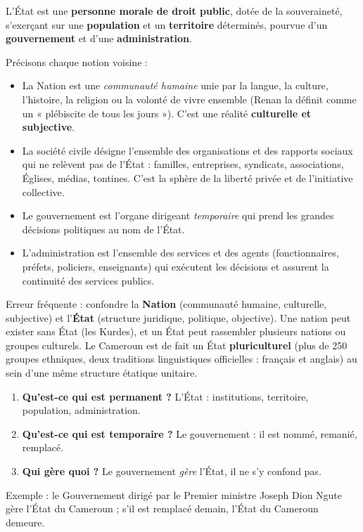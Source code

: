 \documentclass[11pt]{article}
\newcommand{\cle}[1]{{\popxbold\color{popdark}#1}}
\begin{document}
\begin{definition}[L'État]
L'\cle{État} est une \textbf{personne morale de droit public}, dotée de la \cle{souveraineté}, s'exerçant sur une \textbf{population} et un \textbf{territoire} déterminés, pourvue d'un \textbf{gouvernement} et d'une \textbf{administration}.
\end{definition}

Précisons chaque notion voisine :

\begin{itemize}
\item La \cle{Nation} est une \emph{communauté humaine} unie par la langue, la culture, l'histoire, la religion ou la volonté de vivre ensemble (Renan la définit comme un « plébiscite de tous les jours »). C'est une réalité \textbf{culturelle et subjective}.
\item La \cle{société civile} désigne l'ensemble des organisations et des rapports sociaux qui ne relèvent pas de l'État : familles, entreprises, syndicats, associations, Églises, médias, tontines. C'est la sphère de la liberté privée et de l'initiative collective.
\item Le \cle{gouvernement} est l'organe dirigeant \emph{temporaire} qui prend les grandes décisions politiques au nom de l'État.
\item L'\cle{administration} est l'ensemble des services et des agents (fonctionnaires, préfets, policiers, enseignants) qui exécutent les décisions et assurent la continuité des services publics.
\end{itemize}

\begin{attention}
Erreur fréquente : confondre la \textbf{Nation} (communauté humaine, culturelle, subjective) et l'\textbf{État} (structure juridique, politique, objective). Une nation peut exister sans État (les Kurdes), et un État peut rassembler plusieurs nations ou groupes culturels. Le Cameroun est de fait un État \textbf{pluriculturel} (plus de 250 groupes ethniques, deux traditions linguistiques officielles : français et anglais) au sein d'une même structure étatique unitaire.
\end{attention}

\begin{methode}
\begin{enumerate}
\item \textbf{Qu'est-ce qui est permanent ?} L'État : institutions, territoire, population, administration.
\item \textbf{Qu'est-ce qui est temporaire ?} Le gouvernement : il est nommé, remanié, remplacé.
\item \textbf{Qui gère quoi ?} Le gouvernement \emph{gère} l'État, il ne s'y confond pas.
\end{enumerate}
Exemple : le Gouvernement dirigé par le Premier ministre Joseph Dion Ngute gère l'État du Cameroun ; s'il est remplacé demain, l'État du Cameroun demeure.
\end{methode}
\end{document}
